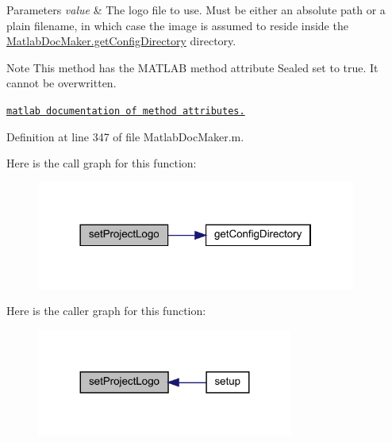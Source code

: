 \begin{DoxyParams}{Parameters}
{\em value} & The logo file to use. Must be either an absolute path or a plain filename, in which case the image is assumed to reside inside the \hyperlink{class_matlab_doc_maker_ac201c45057310993a26a114403254c41}{Matlab\+Doc\+Maker.\+get\+Config\+Directory} directory.\\
\hline
\end{DoxyParams}
\begin{DoxyNote}{Note}
This method has the M\+A\+T\+L\+AB method attribute {\ttfamily Sealed} set to true. It cannot be overwritten. 

\href{http://www.mathworks.com/help/matlab/matlab_oop/method-attributes.html}{\tt matlab documentation of method attributes.} 
\end{DoxyNote}


Definition at line 347 of file Matlab\+Doc\+Maker.\+m.

Here is the call graph for this function\+:\nopagebreak
\begin{figure}[H]
\begin{center}
\leavevmode
\includegraphics[width=298pt]{class_matlab_doc_maker_a01cb613496ec3db0c68249d8af346ac4_cgraph}
\end{center}
\end{figure}
Here is the caller graph for this function\+:\nopagebreak
\begin{figure}[H]
\begin{center}
\leavevmode
\includegraphics[width=239pt]{class_matlab_doc_maker_a01cb613496ec3db0c68249d8af346ac4_icgraph}
\end{center}
\end{figure}
\mbox{\label{class_matlab_doc_maker_ac477800dc8332769ae7a542a49aa6d0c}} 
